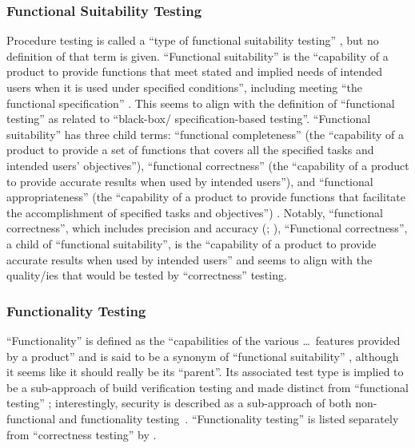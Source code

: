 
\subsubsection{Functional Suitability Testing}
Procedure testing is
called a ``type of functional suitability testing''
\citep[p.~7]{IEEE2022}, but no definition of that term is given.
``Functional suitability'' is the
``capability of a product to provide functions that meet stated and
implied needs of intended users when it is used under specified
conditions'', including meeting ``the functional specification''
\citep{ISO_IEC2023a}. This seems to align with the definition of
``functional testing'' as related to ``black-box/%
specification-based testing''.
\ifnotpaper
      ``Functional suitability'' has
      three child terms: ``functional completeness'' (the ``capability of
      a product to provide a set of functions that covers all the
      specified tasks and intended users' objectives''), ``functional
      correctness'' (the ``capability of a product to provide accurate
      results when used by intended users''), and ``functional
      appropriateness'' (the ``capability of a product to provide
      functions that facilitate the accomplishment of specified tasks and
      objectives'') \citep{ISO_IEC2023a}. Notably, ``functional
      correctness'', which includes precision and accuracy
      (\citealp{ISO_IEC2023a}; \citealpISTQB{}), \else ``Functional
      correctness'', a child of ``functional suitability'', is the ``capability
      of a product to provide accurate results when used by intended users''
      \cite{ISO_IEC2023a} and \fi seems to align with
the quality/ies that would be tested by ``correctness'' testing.

\subsubsection{Functionality Testing}
``Functionality'' is defined as the
``capabilities of the various \dots\ features provided by a product''
\citep[p.~196]{IEEE2017} and is said to be a synonym of
``functional suitability'' \citepISTQB{}, although it seems
like it should really be its ``parent''. Its associated test type
is implied to be a sub-approach of build verification testing
\citepISTQB{} and made distinct from ``functional testing''%
\ifnotpaper; interestingly, security is described as a sub-approach of both
non-functional and functionality testing\fi\ \citep[Tab.~2]{Gerrard2000a}.
``Functionality testing'' is listed separately from ``correctness testing'' by
\citet[p.~53]{Firesmith2015}.

